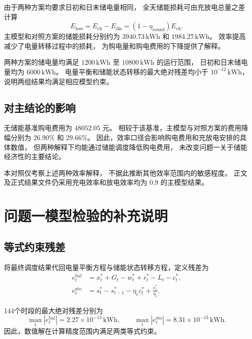 由于两种方案均要求日初和日末储电量相同，
全天储能损耗可由充放电总量之差计算
\begin{equation}
    E_{\mathrm{loss}}
    =
    E_{\mathrm{ch}}-E_{\mathrm{dis}}
    =
    \left(1-\eta_{\mathrm{round}}\right)E_{\mathrm{ch}}.
    \label{eq:app_storage_loss}
\end{equation}
主模型和对照方案的储能损耗分别约为
\(3940.73\,\mathrm{kWh}\) 和 \(1984.27\,\mathrm{kWh}\)。
效率提高减少了电量转移过程中的损耗，
为购电量和购电费用的下降提供了解释。

两种方案的储电量均满足
\(1200\,\mathrm{kWh}\) 至 \(10800\,\mathrm{kWh}\) 的运行范围，
日初和日末储电量均为 \(6000\,\mathrm{kWh}\)。
电量平衡和储能状态转移的最大绝对残差均小于
\(10^{-12}\,\mathrm{kWh}\)，
说明两组结果均满足相应模型约束。

\subsection{对主结论的影响}

无储能基准购电费用为 \(48052.05\) 元。
相较于该基准，主模型与对照方案的费用降幅分别为
\(26.90\%\) 和 \(29.66\%\)。
因此，效率口径会影响购电费用和充放电安排的具体数值，
但两种解释下均能通过储能调度降低购电费用，
未改变问题一关于储能经济性的主要结论。

本对照仅考察上述两种效率解释，
不据此推断其他效率范围内的敏感程度。
正文及正式结果文件仍采用充电效率和放电效率均为 \(0.9\)
的主模型结果。


\section{问题一模型检验的补充说明}
\label{app:q1_milp_check}

\subsection{等式约束残差}

将最终调度结果代回电量平衡方程与储能状态转移方程，定义残差为
\begin{equation}
\begin{aligned}
    e_t^{\mathrm{bal}}
    &=x_t^\ast+G_t-w_t^\ast+r_t^\ast-L_t-c_t^\ast,\\
    e_t^{\mathrm{sto}}
    &=s_t^\ast-s_{t-1}^\ast
      -\eta_c c_t^\ast+\frac{r_t^\ast}{\eta_r}.
\end{aligned}
\label{eq:q1_constraint_residuals}
\end{equation}

144个时段的最大绝对残差分别为
\[
    \max_t\left|e_t^{\mathrm{bal}}\right|
    =2.27\times10^{-13}\,\mathrm{kWh},
    \qquad
    \max_t\left|e_t^{\mathrm{sto}}\right|
    =8.31\times10^{-13}\,\mathrm{kWh}.
\]
因此，数值解在计算精度范围内满足两类等式约束。


